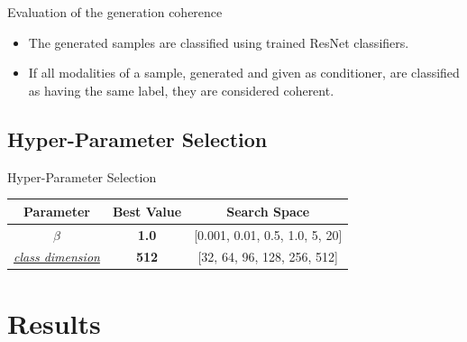     \begin{frame}{Evaluation of the generation coherence}
    \begin{itemize}
        \item The generated samples are classified using trained ResNet classifiers.
        \pause
        \item If all modalities of a sample, generated and given as conditioner, are classified as having the same label, they are considered coherent.
    \end{itemize}
    \end{frame}
    
    \subsection{Hyper-Parameter Selection}
    \begin{frame}{Hyper-Parameter Selection}
        \begin{center}
        \begin{table}[]

        \begin{tabular}{ c c c }
         Parameter & Best Value & Search Space \\ 
         \midrule
         $\beta$ & \textbf{1.0} & [0.001, 0.01, 0.5, 1.0, 5, 20] \\  
         \hyperlink{mopoe_graph}{\textit{class dimension}} & \textbf{512} & [32, 64, 96, 128, 256, 512]    
        \end{tabular}
        \end{table}
        \end{center}

    \end{frame}
    
    
    \section{Results}

